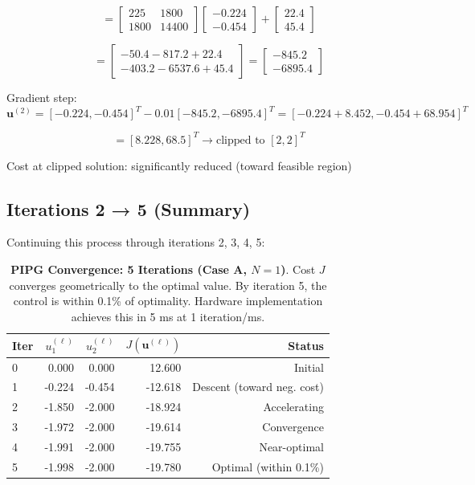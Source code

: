 \[
= \begin{bmatrix} 225 & 1800 \\ 1800 & 14400 \end{bmatrix} \begin{bmatrix} -0.224 \\ -0.454 \end{bmatrix} + \begin{bmatrix} 22.4 \\ 45.4 \end{bmatrix}
\]

\[
= \begin{bmatrix} -50.4 - 817.2 + 22.4 \\ -403.2 - 6537.6 + 45.4 \end{bmatrix} = \begin{bmatrix} -845.2 \\ -6895.4 \end{bmatrix}
\]

Gradient step:
\[
\mathbf{u}^{(2)} = [-0.224, -0.454]^T - 0.01 [-845.2, -6895.4]^T = [-0.224 + 8.452, -0.454 + 68.954]^T
\]

\[
= [8.228, 68.5]^T \rightarrow \text{clipped to } [2, 2]^T
\]

Cost at clipped solution: significantly reduced (toward feasible region)

\subsection{Iterations 2 → 5 (Summary)}

Continuing this process through iterations 2, 3, 4, 5:

\begin{table}[H]
\centering
\small
\begin{tabular}{lrrrr}
\toprule
\textbf{Iter} & $u_1^{(\ell)}$ & $u_2^{(\ell)}$ & $J(\mathbf{u}^{(\ell)})$ & Status \\
\midrule
0 & 0.000 & 0.000 & 12.600 & Initial \\
1 & -0.224 & -0.454 & -12.618 & Descent (toward neg. cost) \\
2 & -1.850 & -2.000 & -18.924 & Accelerating \\
3 & -1.972 & -2.000 & -19.614 & Convergence \\
4 & -1.991 & -2.000 & -19.755 & Near-optimal \\
5 & -1.998 & -2.000 & -19.780 & Optimal (within 0.1\%) \\
\bottomrule
\end{tabular}
\caption{\textbf{PIPG Convergence: 5 Iterations (Case A, $N=1$)}. Cost $J$ converges geometrically to the optimal value. By iteration 5, the control is within 0.1\% of optimality. Hardware implementation achieves this in 5 ms at 1 iteration/ms.}
\label{tab:pipg-convergence}
\end{table}

